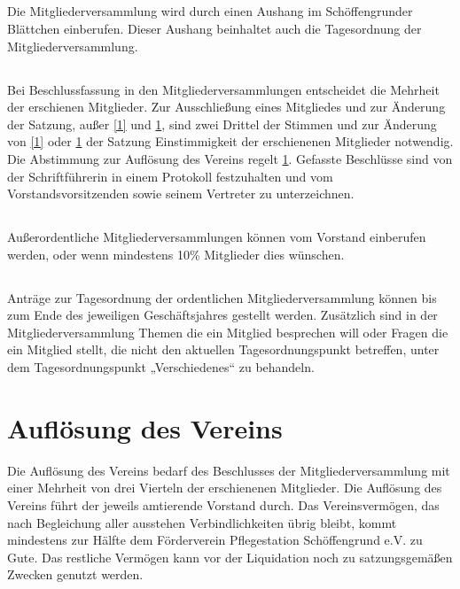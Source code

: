 	
	\subsection{} Die Mitgliederversammlung wird durch einen Aushang im Schöffengrunder Blättchen einberufen. Dieser Aushang beinhaltet auch die Tagesordnung der Mitgliederversammlung.  
	
	\subsection{} Bei Beschlussfassung in den Mitgliederversammlungen entscheidet die Mehrheit der erschienen Mitglieder. Zur Ausschließung eines Mitgliedes und zur Änderung der Satzung, außer \ref{1} und \ref{17}, sind zwei Drittel der Stimmen und zur Änderung von \ref{1} oder \ref{17} der Satzung Einstimmigkeit der erschienenen Mitglieder notwendig. Die Abstimmung zur Auflösung des Vereins regelt \ref{17}. Gefasste Beschlüsse sind von der Schriftführerin in einem Protokoll festzuhalten und vom Vorstandsvorsitzenden sowie seinem Vertreter zu unterzeichnen.  
	
	\subsection{} Außerordentliche Mitgliederversammlungen können vom Vorstand einberufen werden, oder wenn mindestens 10\% Mitglieder dies wünschen. 
	
	\subsection{} Anträge zur Tagesordnung der ordentlichen Mitgliederversammlung können  
	bis zum Ende des jeweiligen Geschäftsjahres gestellt werden. Zusätzlich sind in der Mitgliederversammlung Themen die ein Mitglied besprechen will oder Fragen die ein Mitglied stellt, die nicht den aktuellen Tagesordnungspunkt betreffen, unter dem Tagesordnungspunkt „Verschiedenes“ zu behandeln.

\section{Auflösung des Vereins}	\label{17}
Die Auflösung des Vereins bedarf des Beschlusses der Mitgliederversammlung mit einer Mehrheit von drei Vierteln der erschienenen Mitglieder.
Die Auflösung des Vereins führt der jeweils amtierende Vorstand durch. Das Vereinsvermögen, das nach Begleichung aller ausstehen Verbindlichkeiten übrig bleibt, kommt mindestens zur Hälfte dem Förderverein Pflegestation Schöffengrund e.V. zu Gute. Das restliche Vermögen kann vor der Liquidation noch zu satzungsgemäßen Zwecken genutzt werden. 
















